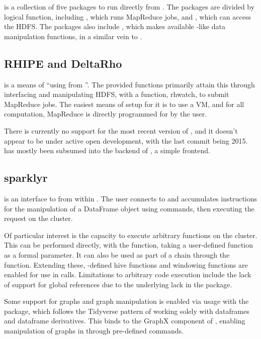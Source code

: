  is a collection of five packages to run  directly from
\R{}\cite{analytics:_rhadoop_wiki}.
The packages are divided by logical function, including , which runs MapReduce jobs, and , which can access the HDFS.
The packages also include , which makes available -like data manipulation functions, in a similar vein to .

\subsection{RHIPE and DeltaRho}\label{subsec:rhipe-deltarho}

 is a means of ``using  from \R{}''\cite{deltarho:_rhipe}.
The provided functions primarily attain this through interfacing and manipulating HDFS, with a function, rhwatch, to submit MapReduce jobs.
The easiest means of setup for it is to use a VM, and for all  computation, MapReduce is directly programmed for by the user.

There is currently no support for the most recent version of , and it doesn't appear to be under active open development, with the last commit being 2015.
 has mostly been subsumed into the backend of
, a simple frontend.

\subsection{sparklyr}\label{subsec:sparklyr}

 is an interface to  from within \R{}\cite{luraschi20}.
The user connects to  and accumulates instructions for the manipulation of a  DataFrame object using  commands, then executing the request on the  cluster.

Of particular interest is the capacity to execute arbitrary \R{} functions on the  cluster.
This can be performed directly, with the  function, taking a user-defined function as a formal parameter.
It can also be used as part of a  chain through the  function.
Extending these, -defined hive functions and windowing functions are enabled for use in  calls.
Limitations to arbitrary code execution include the lack of support for global references due to the underlying lack in the  package.

Some support for graphs and graph manipulation is enabled via usage with the  package, which follows the Tidyverse pattern of working solely with dataframes and dataframe derivatives\cite{kuo18}.
This binds to the GraphX component of , enabling manipulation of graphs in  through pre-defined commands.

